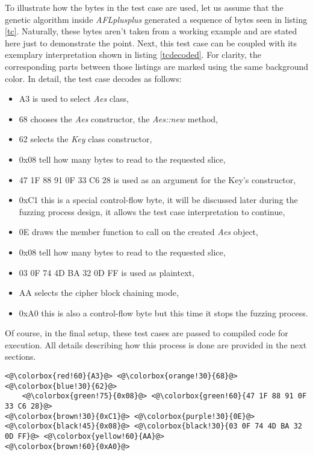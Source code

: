 To illustrate how the bytes in the test case are used, let us assume that the genetic algorithm inside \textit{AFLplusplus} generated a sequence of bytes seen in listing \ref{tc}. Naturally, these bytes aren't taken from a working example and are stated here just to demonstrate the point. Next, this test case can be coupled with its exemplary interpretation shown in listing \ref{tcdecoded}. For clarity, the corresponding parts between those listings are marked using the same background color. In detail, the test case decodes as follows:
\begin{itemize}
    \item \colorbox{red!60}{A3} is used to select \textit{Aes} class,
    \item \colorbox{orange!30}{68} chooses the \textit{Aes} constructor, the \textit{Aes::new} method,
    \item \colorbox{blue!30}{62} selects the \textit{Key} class constructor,
    \item \colorbox{green!75}{0x08} tell how many bytes to read to the requested slice,
    \item \colorbox{green!60}{47 1F 88 91 0F 33 C6 28} is used as an argument for the Key's constructor,
    \item \colorbox{brown!30}{0xC1} this is a special control-flow byte, it will be discussed later during the fuzzing process design, it allows the test case interpretation to continue,
    \item \colorbox{purple!30}{0E} draws the member function to call on the created \textit{Aes} object,
    \item \colorbox{black!45}{0x08} tell how many bytes to read to the requested slice,
    \item \colorbox{black!30}{03 0F 74 4D BA 32 0D FF} is used as plaintext,
    \item \colorbox{yellow!60}{AA} selects the cipher block chaining mode,
    \item \colorbox{brown!60}{0xA0} this is also a control-flow byte but this time it stops the fuzzing process.
\end{itemize}
Of course, in the final setup, these test cases are passed to compiled code for execution. All details describing how this process is done are provided in the next sections. 

\begin{minipage}{\linewidth}
\begin{lstlisting}[caption={Example test case.},label={tc}]
<@\colorbox{red!60}{A3}@> <@\colorbox{orange!30}{68}@> <@\colorbox{blue!30}{62}@> 
    <@\colorbox{green!75}{0x08}@> <@\colorbox{green!60}{47 1F 88 91 0F 33 C6 28}@> 
<@\colorbox{brown!30}{0xC1}@> <@\colorbox{purple!30}{0E}@> <@\colorbox{black!45}{0x08}@> <@\colorbox{black!30}{03 0F 74 4D BA 32 0D FF}@> <@\colorbox{yellow!60}{AA}@> 
<@\colorbox{brown!60}{0xA0}@>
\end{lstlisting}
\end{minipage}

